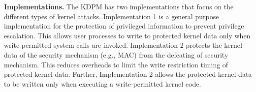 

{\bf Implementations.}
The KDPM has two implementations that focus on the different types of kernel
attacks.
%
Implementation 1 is a general purpose implementation for the protection of privileged
information to prevent privilege escalation. 
%
This allows user processes to write to protected kernel data only when
write-permitted system calls are invoked.
%
Implementation 2 protects the kernel data of the security mechanism (e.g., MAC)
from the defeating of security mechanism. 
%
This reduces overheads to limit the write restriction timing of protected kernel
data.
Further, Implementation 2 allows the protected kernel data to be written only
when executing a write-permitted kernel code.

